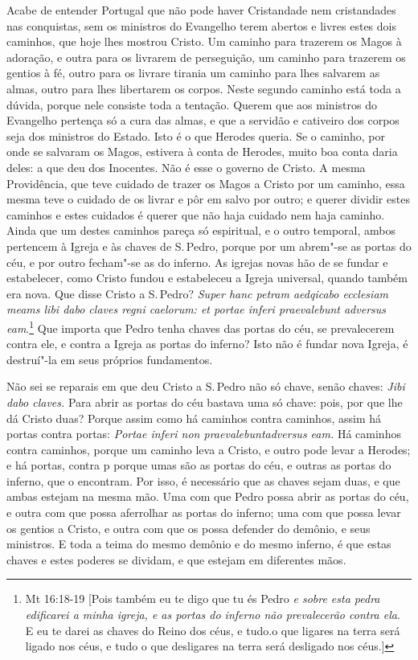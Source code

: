 Acabe de entender Portugal que não pode haver Cristandade nem
cristandades nas conquistas, sem os ministros do Evangelho terem abertos
e livres estes dois caminhos, que hoje lhes mostrou Cristo. Um caminho
para trazerem os Magos à adoração, e outra para os livrarem de
perseguição, um caminho para trazerem os gentios à fé, outro para os
livrare tirania um caminho para lhes salvarem as almas, outro para lhes
libertarem os corpos. Neste segundo caminho está toda a dúvida, porque
nele consiste toda a tentação. Querem que aos ministros do Evangelho
pertença só a cura das almas, e que a servidão e cativeiro dos corpos
seja dos ministros do Estado. Isto é o que Herodes queria. Se o caminho,
por onde se salvaram os Magos, estivera à conta de Herodes, muito boa
conta daria deles: a que deu dos Inocentes. Não é esse o governo de
Cristo. A mesma Providência, que teve cuidado de trazer os Magos a
Cristo por um caminho, essa mesma teve o cuidado de os livrar e pôr em
salvo por outro; e querer dividir estes caminhos e estes cuidados é
querer que não haja cuidado nem haja caminho. Ainda que um destes
caminhos pareça só espiritual, e o outro temporal, ambos pertencem à
Igreja e às chaves de S.\,Pedro, porque por um abrem"-se as portas do céu,
e por outro fecham"-se as do inferno. As igrejas novas hão de se fundar
e estabelecer, como Cristo fundou e estabeleceu a Igreja universal,
quando também era nova. Que disse Cristo a S.\,Pedro? \emph{Super hanc
petram aedqicabo ecclesiam meams libi dabo claves regni caelorum: et
portae inferi praevalebunt adversus eam}.\footnote{Mt 16:18-19 [Pois também eu te digo que tu és Pedro \emph{e sobre esta pedra edificarei a minha igreja,
e as portas do inferno não prevalecerão contra ela}. E eu te darei as chaves do Reino dos céus, e tudo.o que ligares na terra será ligado nos céus, e tudo o que desligares na terra será desligado nos céus.]} Que importa que
Pedro tenha chaves das portas do céu, se prevalecerem contra ele, e
contra a Igreja as portas do inferno? Isto não é fundar nova Igreja, é
destruí"-la em seus próprios fundamentos.

Não sei se reparais em que deu Cristo a S.\,Pedro não só chave, senão
chaves: \emph{Jibi dabo claves.} Para abrir as portas do céu bastava uma
só chave: pois, por que lhe dá Cristo duas? Porque assim como há
caminhos contra caminhos, assim há portas contra portas:
\emph{Portae inferi non praevalebuntadversus eam.} Há caminhos contra
caminhos, porque um caminho leva a Cristo, e outro pode levar a Herodes;
e há portas, contra p porque umas são as portas do céu, e outras as
portas do inferno, que o encontram. Por isso, é necessário que as chaves
sejam duas, e que ambas estejam na mesma mão. Uma com que Pedro possa
abrir as portas do céu, e outra com que possa aferrolhar as portas do
inferno; uma com que possa levar os gentios a Cristo, e outra com que os
possa defender do demônio, e seus ministros. E toda a teima do mesmo
demônio e do mesmo inferno, é que estas chaves e estes poderes se
dividam, e que estejam em diferentes mãos.

